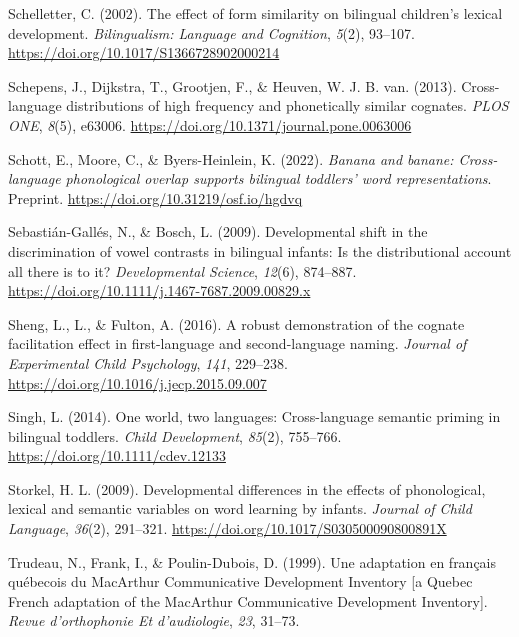 \documentclass[
  ,man,floatsintext]{apa6}
\newlength{\cslhangindent}
\newlength{\cslentryspacingunit} %
\newenvironment{CSLReferences}[2] %
 {%
  \setlength{\parindent}{0pt}
  \ifodd #1
  \let\oldpar\par
  \def\par{\hangindent=\cslhangindent\oldpar}
  \fi
  \setlength{\parskip}{#2\cslentryspacingunit}
 }%
 {}
\begin{document}
\begin{CSLReferences}{1}{0}
\leavevmode{}%
Schelletter, C. (2002). The effect of form similarity on bilingual children's lexical development. \emph{Bilingualism: Language and Cognition}, \emph{5}(2), 93--107. \url{https://doi.org/10.1017/S1366728902000214}

\leavevmode{}%
Schepens, J., Dijkstra, T., Grootjen, F., \& Heuven, W. J. B. van. (2013). Cross-language distributions of high frequency and phonetically similar cognates. \emph{PLOS ONE}, \emph{8}(5), e63006. \url{https://doi.org/10.1371/journal.pone.0063006}

\leavevmode{}%
Schott, E., Moore, C., \& Byers-Heinlein, K. (2022). \emph{Banana and banane: Cross-language phonological overlap supports bilingual toddlers' word representations}. Preprint. \url{https://doi.org/10.31219/osf.io/hgdvq}

\leavevmode{}%
Sebastián-Gallés, N., \& Bosch, L. (2009). Developmental shift in the discrimination of vowel contrasts in bilingual infants: Is the distributional account all there is to it? \emph{Developmental Science}, \emph{12}(6), 874--887. \url{https://doi.org/10.1111/j.1467-7687.2009.00829.x}

\leavevmode{}%
Sheng, L., L., \& Fulton, A. (2016). A robust demonstration of the cognate facilitation effect in first-language and second-language naming. \emph{Journal of Experimental Child Psychology}, \emph{141}, 229--238. \url{https://doi.org/10.1016/j.jecp.2015.09.007}

\leavevmode{}%
Singh, L. (2014). One world, two languages: Cross-language semantic priming in bilingual toddlers. \emph{Child Development}, \emph{85}(2), 755--766. \url{https://doi.org/10.1111/cdev.12133}

\leavevmode{}%
Storkel, H. L. (2009). Developmental differences in the effects of phonological, lexical and semantic variables on word learning by infants. \emph{Journal of Child Language}, \emph{36}(2), 291--321. \url{https://doi.org/10.1017/S030500090800891X}

\leavevmode{}%
Trudeau, N., Frank, I., \& Poulin-Dubois, D. (1999). Une adaptation en français québecois du MacArthur {C}ommunicative {D}evelopment {I}nventory {[}a {Q}uebec {F}rench adaptation of the MacArthur {C}ommunicative {D}evelopment {I}nventory{]}. \emph{Revue d'orthophonie Et d'audiologie}, \emph{23}, 31--73.


\end{CSLReferences}
\end{document}
